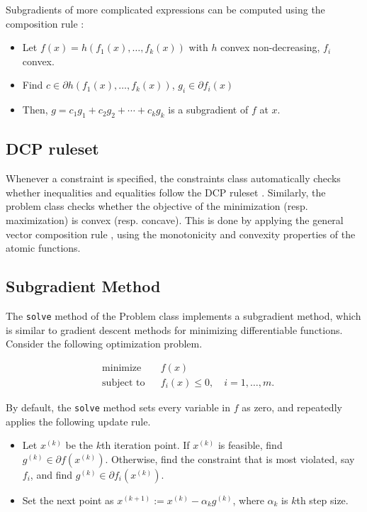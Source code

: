 \documentclass[12pt]{article}
\begin{document}
Subgradients of more complicated expressions can be computed 
using the composition rule \cite{subg}:
\begin{itemize}
\item Let $f(x) = h(f_1(x), \ldots, f_k(x))$ with $h$ convex non-decreasing,
  $f_i$ convex.
\item Find $c \in \partial h(f_1(x), \ldots, f_k(x))$,  $g_i \in \partial
  f_i(x)$
\item Then, $g = c_1 g_1 + c_2 g_2 + \cdots + c_k g_k$ is a subgradient of $f$ at $x$.
\end{itemize}


\subsection{DCP ruleset}
Whenever a constraint is specified, the constraints class automatically checks whether inequalities and equalities follow the DCP ruleset \cite{guide}. Similarly, the problem class checks whether the objective of the minimization (resp. maximization) is convex (resp. concave). This is done by applying the general vector composition rule \cite{cvx}, using the monotonicity and convexity properties of the atomic functions.


\subsection{Subgradient Method}
The \verb'solve' method of the Problem class implements a subgradient method, which is similar to gradient descent methods for minimizing differentiable functions. Consider the following optimization problem.

\begin{equation*}
\begin{aligned}
&\mbox{minimize}&&f(x)\\
&\mbox{subject to}&&f_i(x) \le 0, \quad i = 1, \ldots, m.
\end{aligned}
\end{equation*}

By default, the \verb'solve' method sets every variable in $f$ as zero, and repeatedly applies the following update rule.

\begin{itemize}
\item Let $x^{(k)}$ be the $k$th iteration point. If $x^{(k)}$ is feasible, find $g^{(k)} \in \partial f(x^{(k)})$. Otherwise, find the constraint that is most violated, say $f_i$, and find $g^{(k)} \in \partial f_i(x^{(k)})$.
\item Set the next point as $x^{(k+1)}:=x^{(k)}-\alpha_k g^{(k)}$, where $\alpha_k$ is $k$th step size.
\end{itemize}
\end{document}
